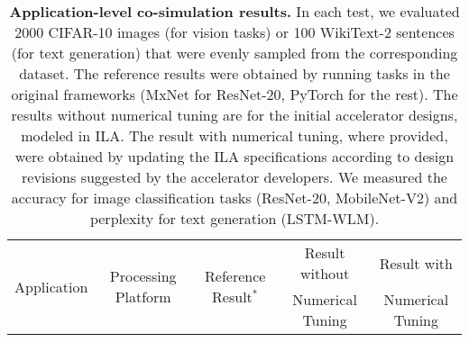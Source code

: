 \begin{table*}
  \caption{
  \textbf{Application-level co-simulation results.}
  In each test, we evaluated 2000 CIFAR-10 images (for vision tasks) or 100 WikiText-2 sentences (for text generation) that were evenly sampled from the corresponding dataset.
  The reference results were obtained by running tasks in the original frameworks (MxNet for ResNet-20, PyTorch for the rest).
  The {results without numerical tuning} are %
  for the initial accelerator designs, modeled in ILA.
  The {result with numerical tuning}, where provided, were obtained by updating the ILA specifications
  according to %
  design revisions suggested by the accelerator developers.
  We measured the accuracy for image classification tasks (ResNet-20, MobileNet-V2) and perplexity for text generation (LSTM-WLM).}
  \label{tab.verif-sim}
  \centering
  \small
  \begin{tabular}{|l|c|c|c|c|}
  \hline
      \multicolumn{1}{|c|}{\multirow{2}{*}{Application}} &
      \multirow{2}{*}{Processing Platform} &
      \multirow{2}{*}{Reference Result$^\ast$} &
      {Result without} &
      {Result with}\\
    \multicolumn{1}{|c|}{} &
       &
       &
      {Numerical Tuning} &
      {Numerical Tuning} \\
    \hline \hline


\end{tabular}
\end{table*}
